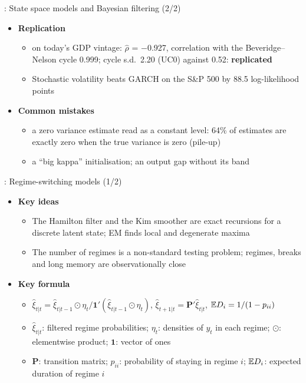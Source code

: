 \begin{frame}{: State space models and Bayesian filtering (2/2)}
\itemsize{\small}
\begin{itemize}
    \item \textbf{Replication}
    \begin{itemize}
        \item {} on today's GDP vintage: $\hat\rho$ = \ensuremath{-}0.927, correlation with the Beveridge--Nelson cycle 0.999; cycle s.d.\ 2.20 (UC0) against 0.52: \textbf{replicated}
        \item Stochastic volatility beats GARCH on the S\&P 500 by 88.5 log-likelihood points
    \end{itemize}
    \item \textbf{Common mistakes}
    \begin{itemize}
        \item a zero variance estimate read as a constant level: 64\% of estimates are exactly zero when the true variance is zero (pile-up)
        \item a ``big kappa'' initialisation; an output gap without its band
    \end{itemize}
\end{itemize}
\end{frame}

\begin{frame}{: Regime-switching models (1/2)}
\itemsize{\footnotesize}
\begin{itemize}
    \item \textbf{Key ideas}
    \begin{itemize}
        \item The Hamilton filter and the Kim smoother are exact recursions for a discrete latent state; EM finds local and degenerate maxima
        \item The number of regimes is a non-standard testing problem; regimes, breaks and long memory are observationally close
    \end{itemize}
    \item \textbf{Key formula}
    \begin{itemize}
        \item $\hat\xi_{t|t} = \hat\xi_{t|t-1}\odot\eta_t/\mathbf 1'(\hat\xi_{t|t-1}\odot\eta_t)$, $\hat\xi_{t+1|t} = \mathbf P'\hat\xi_{t|t}$, $\mathbb{E} D_i = 1/(1 - p_{ii})$
        \item $\hat\xi_{t|t}$: filtered regime probabilities; $\eta_t$: densities of $y_t$ in each regime; $\odot$: elementwise product; $\mathbf 1$: vector of ones
        \item $\mathbf P$: transition matrix; $p_{ii}$: probability of staying in regime $i$; $\mathbb{E} D_i$: expected duration of regime $i$
    \end{itemize}
\end{itemize}
\end{frame}

